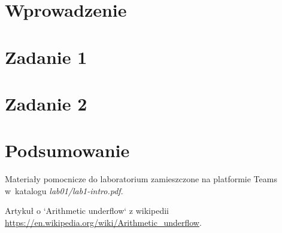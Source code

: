 \documentclass{sprawozdanie-agh}
\begin{document}

\stronatytulowa{}

\section{Wprowadzenie}



\section{Zadanie 1}




\section{Zadanie 2}




\section{Podsumowanie}



\begin{thebibliography}{3}

Materiały pomocnicze do laboratorium zamieszczone na platformie Teams w~katalogu \emph{lab01/lab1-intro.pdf}.


Artykuł o `Arithmetic underflow` z wikipedii \url{https://en.wikipedia.org/wiki/Arithmetic_underflow}.

\end{thebibliography}
\end{document}
